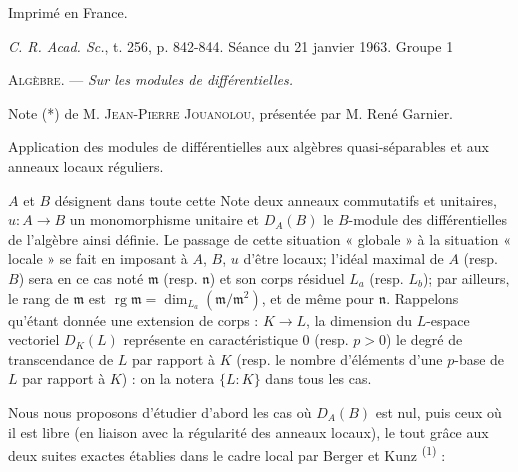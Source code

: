 \begin{center}Imprimé en France.\end{center}


\textit{C. R. Acad. Sc.}, t. 256, p. 842-844. \hfill Séance du 21 janvier 1963. \hfill Groupe 1

\textsc{Algèbre.} --- \textit{Sur les modules de différentielles.}

Note (*) de M. \textsc{Jean-Pierre Jouanolou}, présentée par M. René Garnier.

Application des modules de différentielles aux algèbres quasi-séparables et aux anneaux locaux réguliers.

$A$ et $B$ désignent dans toute cette Note deux anneaux commutatifs et unitaires, $u:A\to B$ un monomorphisme unitaire et $D_A(B)$ le $B$-module des différentielles de l'algèbre ainsi définie. Le passage de cette situation « globale » à la situation « locale » se fait en imposant à $A$, $B$, $u$ d'être locaux; l'idéal maximal de $A$ (resp. $B$) sera en ce cas noté $\mathfrak m$ (resp. $\mathfrak n$) et son corps résiduel $L_a$ (resp. $L_b$); par ailleurs, le rang de $\mathfrak m$ est $\operatorname{rg}\mathfrak m=\dim_{L_a}(\mathfrak m/\mathfrak m^2)$, et de même pour $\mathfrak n$. Rappelons qu'étant donnée une extension de corps : $K\to L$, la dimension du $L$-espace vectoriel $D_K(L)$ représente en caractéristique $0$ (resp. $p>0$) le degré de transcendance de $L$ par rapport à $K$ (resp. le nombre d'éléments d'une $p$-base de $L$ par rapport à $K$) : on la notera $\{L:K\}$ dans tous les cas.

Nous nous proposons d'étudier d'abord les cas où $D_A(B)$ est nul, puis ceux où il est libre (en liaison avec la régularité des anneaux locaux), le tout grâce aux deux suites exactes établies dans le cadre local par Berger et Kunz \textsuperscript{(1)} :




